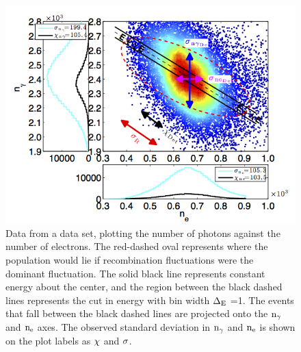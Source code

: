 \renewcommand{\baselinestretch}{1}
\small\normalsize
 \begin{figure}[h!]\centering
\includegraphics[width=160mm]{Chapter_Flucs/Figures/Ex_Plots/Real_Stat_R_Kr_.png}
\caption{Data from a \KrCal data set, plotting the number of photons against the number of electrons. The red-dashed oval represents where the population would lie if recombination fluctuations were the dominant fluctuation. The solid black line represents constant energy about the center, and the region between the black dashed lines represents the cut in energy with bin width $\rm \Delta_E$ =1. The events that fall between the black dashed lines are projected onto the $\rm n_\gamma$ and $\rm n_e$ axes. The observed standard deviation in $\rm n_\gamma$ and $\rm n_e$ is shown on the plot labels as $\rm \chi$ and $\rm \sigma$. }
\label{fig:Kr_ex_Stat}
\end{figure}

